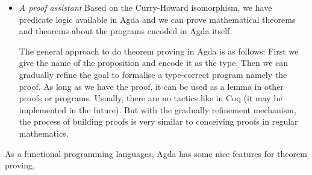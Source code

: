 \begin{itemize}

\item \textit{A proof assistant} Based on the Curry-Howard isomorphism, we have predicate logic available in Agda and we can prove mathematical theorems and theorems about the programs encoded in Agda itself. 

The general approach to do theorem proving in Agda is as follows: First we give the name of the proposition and encode it as the type. Then we can gradually refine the goal to formalise a type-correct program namely the proof. As long as we have the proof, it can be used as a lemma in other proofs or programs. Usually, there are no tactics like in Coq (it may be implemented in the future). But with the gradually refinement mechanism, the process of building proofs is very similar to conceiving proofs in regular mathematics.

\end{itemize}

As a functional programming languages, Agda has some nice features for theorem proving,

